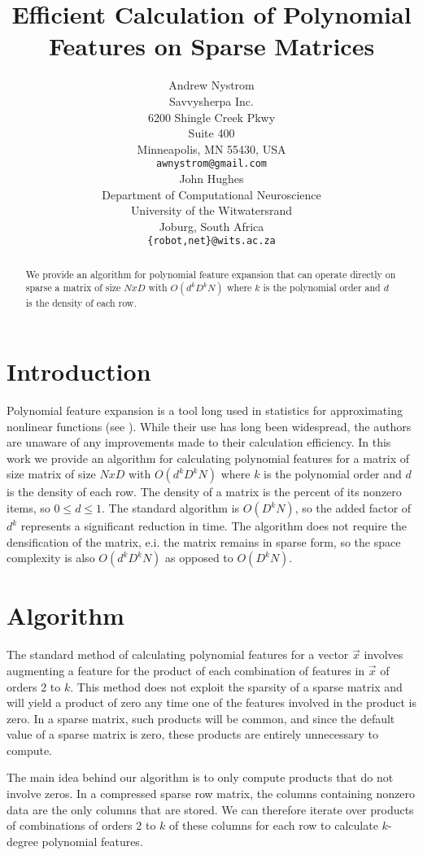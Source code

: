 \documentclass{article} %
\title{Efficient Calculation of Polynomial Features on Sparse Matrices}
\author{Andrew Nystrom \\
Savvysherpa Inc.\\
6200 Shingle Creek Pkwy \\
Suite 400 \\
Minneapolis, MN 55430, USA \\
\texttt{awnystrom@gmail.com} \\
\And
John Hughes \\
Department of Computational Neuroscience \\
University of the Witwatersrand \\
Joburg, South Africa \\
\texttt{\{robot,net\}@wits.ac.za} \\
}
\begin{document}
\maketitle

\begin{abstract}
We provide an algorithm for polynomial feature expansion that can operate directly on sparse a
matrix of size $NxD$ with $O(d^kD^kN)$ where $k$ is the polynomial order and $d$ is the density of each row.

\end{abstract}

\section{Introduction}

Polynomial feature expansion is a tool long used in statistics for approximating nonlinear functions (see \cite{gergonne1974application, smith1918standard}).
While their use has long been widespread, the authors are unaware of any improvements made to their calculation efficiency.
In this work we provide an algorithm for calculating polynomial features for a matrix of size matrix of size $NxD$ with $O(d^kD^kN)$ where $k$ is the polynomial order and $d$ is the density of each row.
The density of a matrix is the percent of its nonzero items, so $0 \le d \le 1$. The standard algorithm is $O(D^kN)$, so the added factor of $d^k$ represents a significant reduction in time.
The algorithm does not require the densification of the matrix, e.i. the matrix remains in sparse form, so the space complexity is also $O(d^kD^kN)$ as opposed to $O(D^kN)$.

\section{Algorithm}
The standard method of calculating polynomial features for a vector $\vec{x}$ involves augmenting a feature for the product of each combination of features in $\vec{x}$ of orders 2 to $k$.
This method does not exploit the sparsity of a sparse matrix and will yield a product of zero any time one of the features involved in the product is zero.
In a sparse matrix, such products will be common, and since the default value of a sparse matrix is zero, these products are entirely unnecessary to compute.

The main idea behind our algorithm is to only compute products that do not involve zeros.
In a compressed sparse row matrix, the columns containing nonzero data are the only columns that are stored.
We can therefore iterate over products of combinations of orders 2 to $k$ of these columns for each row to calculate $k$-degree polynomial features.
\end{document}
